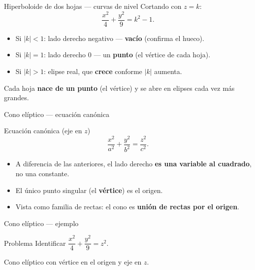 \documentclass[11pt,aspectratio=169]{beamer}
\begin{document}
\begin{frame}{Hiperboloide de dos hojas --- curvas de nivel}
  Cortando con $z=k$:
  \[
    \frac{x^2}{4}+\frac{y^2}{9}=k^2-1.
  \]
  \pause
  \begin{itemize}
    \item Si $|k|<1$: lado derecho negativo --- \textbf{vacío} (confirma el hueco).
    \pause
    \item Si $|k|=1$: lado derecho $0$ --- un \textbf{punto} (el vértice de cada hoja).
    \pause
    \item Si $|k|>1$: elipse real, que \textbf{crece} conforme $|k|$ aumenta.
  \end{itemize}
  \pause
  \begin{center}\normalsize\color{tealx}
  Cada hoja \textbf{nace de un punto} (el vértice) y se abre en elipses cada vez más grandes.
  \end{center}
\end{frame}


\begin{frame}{Cono elíptico --- ecuación canónica}
  \begin{block}{Ecuación canónica (eje en $z$)}
    \[
      \frac{x^2}{a^2}+\frac{y^2}{b^2}=\frac{z^2}{c^2}.
    \]
  \end{block}
  \pause
  \begin{itemize}
    \item A diferencia de las anteriores, el lado derecho \textbf{es una variable al cuadrado}, no una constante.
    \pause
    \item El único punto singular (el \textbf{vértice}) es el origen.
    \pause
    \item Vista como familia de rectas: el cono es \textbf{unión de rectas por el origen}.
  \end{itemize}
\end{frame}

\begin{frame}{Cono elíptico --- ejemplo}
  \begin{block}{Problema}
    Identificar $\dfrac{x^2}{4}+\dfrac{y^2}{9}=z^2$.
  \end{block}
  \pause
  \begin{center}\normalsize\color{tealx}
  Cono elíptico con vértice en el origen y eje en $z$.
  \end{center}
\end{frame}
\end{document}
